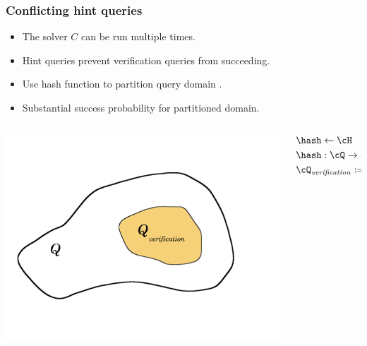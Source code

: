 \documentclass[first,firstsupp, last]{ETHclass}
\begin{document}
\begin{frame}[t]
  \frametitle{Conflicting hint queries}
  \begin{itemize}
    \item<1-4> The solver $C$ can be run multiple times.
    \item<2-4> Hint queries prevent verification queries from succeeding.
    \item<3-4> Use hash function to partition query domain \cite{dodis2009security}.
    \item<4> Substantial success probability for partitioned domain.
  \end{itemize}
  \begin{columns}
    \begin{column}{.4\textwidth}
      \includegraphics[scale=0.08]{images/hashSets.pdf}
    \end{column}
    \begin{column}{.4\textwidth}
      \begin{align*}
        &\hash \leftarrow \cH \\
        &\hash : \cQ \rightarrow \{0,1,\dots, 2(h+v) - 1\} \\
        &\cQ_{\mathit{verification}} := \{q \in \cQ : hash(q) = 0\}
      \end{align*}
    \end{column}
  \end{columns}
\end{frame}
\end{document}
